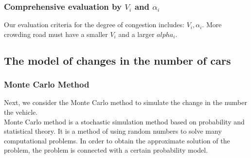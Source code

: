 \documentclass[UTF8]{mcmthesis}
\begin{document}
\subsubsection{Comprehensive evaluation by $V_{i}$ and $\alpha_{i}$}

\indent  Our evaluation criteria for the degree of congestion includes: $V_{i}, \alpha_{i} $. More crowding road must have a smaller $V_{i}$ and a larger $alpha_{i}$.\\

\subsection{The model of changes in the number of cars}
\label{changes of cars}
\subsubsection{Monte Carlo Method}
\indent Next, we consider the Monte Carlo method to simulate the change in the number the vehicle.\\
\indent Monte Carlo method is a stochastic simulation method based on probability and statistical theory. It is a method of using random numbers to solve many computational problems. In order to obtain the approximate solution of the problem, the problem is connected with a certain probability model. \\
\end{document}
